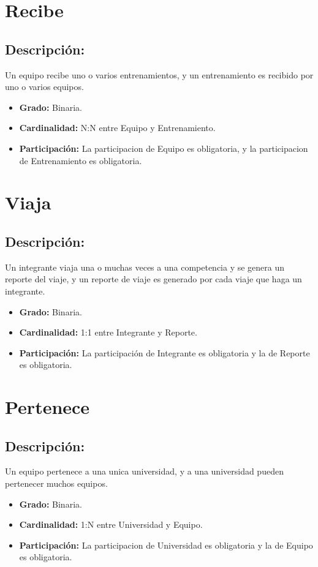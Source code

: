 \documentclass[doc, 12pt, donotrepeattitle]{apa6}
\begin{document}
\section*{Recibe}
\subsection*{Descripción:}
Un equipo recibe uno o varios entrenamientos, y un entrenamiento es recibido por uno o varios equipos.
\begin{itemize}
\item \textbf{Grado:} Binaria.
\item \textbf{Cardinalidad:} N:N entre Equipo y Entrenamiento.
\item \textbf{Participación:} La participacion de Equipo es obligatoria, y la participacion de Entrenamiento es obligatoria.
\end{itemize}

\section*{Viaja}
\subsection*{Descripción:}
Un integrante viaja una o muchas veces a una competencia y se genera un reporte del viaje, y un reporte de viaje es generado por cada viaje que haga un integrante.
\begin{itemize}
\item \textbf{Grado:} Binaria.
\item \textbf{Cardinalidad:} 1:1 entre Integrante y Reporte.
\item \textbf{Participación:} La participación de Integrante es obligatoria y la de Reporte es obligatoria.
\end{itemize}

\section*{Pertenece}
\subsection*{Descripción:}
Un equipo pertenece a una unica universidad, y a una universidad pueden pertenecer muchos equipos.
\begin{itemize}
\item \textbf{Grado:} Binaria.
\item \textbf{Cardinalidad:} 1:N entre Universidad y Equipo.
\item \textbf{Participación:} La participacion de Universidad es obligatoria y la de Equipo es obligatoria.
\end{itemize}
\end{document}
